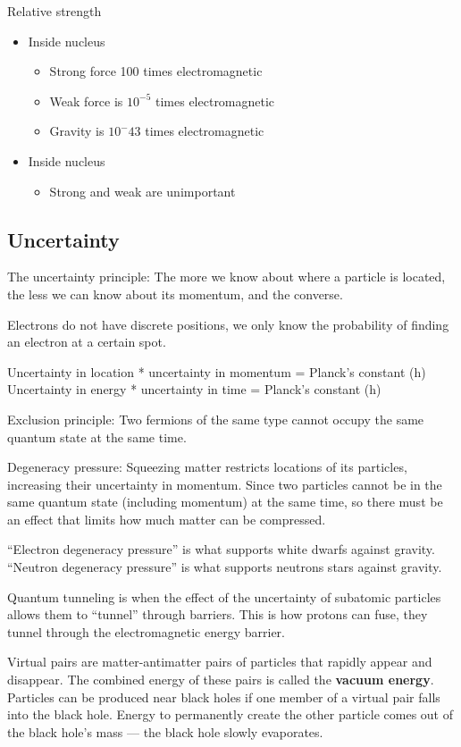 Relative strength
\begin{itemize}
    \item Inside nucleus
    \begin{itemize}
        \item Strong force 100 times electromagnetic
        \item Weak force is $10^{-5}$ times electromagnetic
        \item Gravity is $10^-{43}$ times electromagnetic
    \end{itemize}
    \item Inside nucleus
    \begin{itemize}
        \item Strong and weak are unimportant
    \end{itemize}
\end{itemize}

\subsection{Uncertainty}

The uncertainty principle: The more we know about where a particle is located, the less we can know about its momentum, and the converse.

Electrons do not have discrete positions, we only know the probability of finding an electron at a certain spot.

Uncertainty in location * uncertainty in momentum = Planck's constant (h)\\
Uncertainty in energy * uncertainty in time = Planck's constant (h)

Exclusion principle: Two fermions of the same type cannot occupy the same quantum state at the same time.

Degeneracy pressure: Squeezing matter restricts locations of its particles, increasing their uncertainty in momentum.  Since two particles cannot be in the same quantum state (including momentum) at the same time, so there must be an effect that limits how much matter can be compressed.

``Electron degeneracy pressure'' is what supports white dwarfs against gravity.  ``Neutron degeneracy pressure'' is what supports neutrons stars against gravity.

Quantum tunneling is when the effect of the uncertainty of subatomic particles allows them to ``tunnel'' through barriers.  This is how protons can fuse, they tunnel through the electromagnetic energy barrier.


Virtual pairs are matter-antimatter pairs of particles that rapidly appear and disappear.  The combined energy of these pairs is called the \textbf{vacuum energy}.  Particles can be produced near black holes if one member of a virtual pair falls into the black hole.  Energy to permanently create the other particle comes out of the black hole's mass --- the black hole slowly evaporates.
